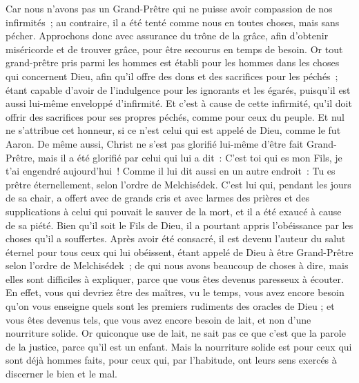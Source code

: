 \begin{multicols}{2}
Car nous n'avons pas un Grand-Prêtre qui ne puisse avoir compassion de nos infirmités~; au contraire, il a été tenté comme nous en toutes choses, mais sans pécher.
Approchons donc avec assurance du trône de la grâce, afin d'obtenir miséricorde et de trouver grâce, pour être secourus en temps de besoin.
\VerseOne{}Or tout grand-prêtre pris parmi les hommes est établi pour les hommes dans les choses qui concernent Dieu, afin qu'il offre des dons et des sacrifices pour les péchés~;
étant capable d'avoir de l'indulgence pour les ignorants et les égarés, puisqu'il est aussi lui-même enveloppé d'infirmité.
Et c'est à cause de cette infirmité, qu'il doit offrir des sacrifices pour ses propres péchés, comme pour ceux du peuple.
Et nul ne s'attribue cet honneur, si ce n'est celui qui est appelé de Dieu, comme le fut Aaron.
De même aussi, Christ ne s'est pas glorifié lui-même d'être fait Grand-Prêtre, mais il a été glorifié par celui qui lui a dit~: C'est toi qui es mon Fils, je t'ai engendré aujourd'hui~!
Comme il lui dit aussi en un autre endroit~: Tu es prêtre éternellement, selon l'ordre de Melchisédek.
C'est lui qui, pendant les jours de sa chair, a offert avec de grands cris et avec larmes des prières et des supplications à celui qui pouvait le sauver de la mort, et il a été exaucé à cause de sa piété.
Bien qu'il soit le Fils de Dieu, il a pourtant appris l'obéissance par les choses qu'il a souffertes.
Après avoir été consacré, il est devenu l'auteur du salut éternel pour tous ceux qui lui obéissent,
étant appelé de Dieu à être Grand-Prêtre selon l'ordre de Melchisédek~;
de qui nous avons beaucoup de choses à dire, mais elles sont difficiles à expliquer, parce que vous êtes devenus  paresseux à écouter.
En effet, vous qui devriez être des maîtres, vu le temps, vous avez encore besoin qu'on vous enseigne quels sont les premiers rudiments des oracles de Dieu ; et vous êtes devenus tels, que vous avez encore besoin de lait, et non d’une nourriture solide.
Or quiconque use de lait, ne sait pas ce que c'est que la parole de la justice, parce qu'il est un enfant.
Mais la nourriture solide est pour ceux qui sont déjà hommes faits, pour ceux qui, par l'habitude, ont leurs sens exercés à discerner le bien et le mal.

\end{multicols}

